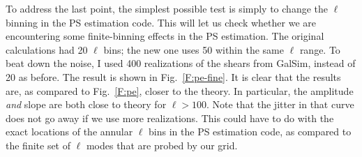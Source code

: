 \documentclass[preprint]{aastex}
\begin{document}
To address the last point, the simplest possible test is simply to
change the $\ell$ binning in the PS estimation code.  This will let us
check whether we are encountering some finite-binning effects in the
PS estimation.  The original calculations had 20 $\ell$ bins; the new
one uses 50 within the same $\ell$ range.  To beat down the noise, I
used 400 realizations of the shears from GalSim, instead of 20 as
before.  The result is shown in Fig.~\ref{F:pe-fine}.  It is clear
that the results are, as compared to Fig.~\ref{F:pe}, closer to the
theory.  In particular, the amplitude {\em and} slope are both close
to theory for $\ell>100$.  Note that the jitter in that curve does not
go away if we use more realizations.  This could have to do with the
exact locations of the annular $\ell$ bins in the PS estimation code,
as compared to the finite set of $\ell$ modes that are probed by our
grid.
\end{document}
